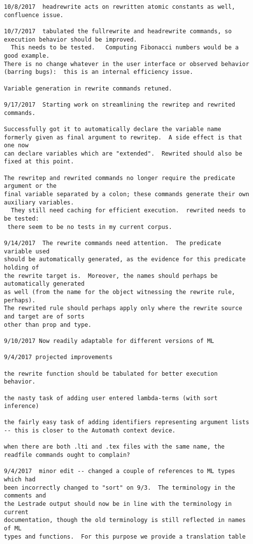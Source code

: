 \documentclass{article}
\begin{document}
{\begin{verbatim}
10/8/2017  headrewrite acts on rewritten atomic constants as well, confluence issue.

10/7/2017  tabulated the fullrewrite and headrewrite commands, so execution behavior should be improved.
  This needs to be tested.   Computing Fibonacci numbers would be a good example.  
There is no change whatever in the user interface or observed behavior (barring bugs):  this is an internal efficiency issue.

Variable generation in rewrite commands retuned.

9/17/2017  Starting work on streamlining the rewritep and rewrited commands.

Successfully got it to automatically declare the variable name 
formerly given as final argument to rewritep.  A side effect is that one now 
can declare variables which are "extended".  Rewrited should also be fixed at this point.

The rewritep and rewrited commands no longer require the predicate argument or the
final variable separated by a colon; these commands generate their own auxiliary variables.
  They still need caching for efficient execution.  rewrited needs to be tested: 
 there seem to be no tests in my current corpus.

9/14/2017  The rewrite commands need attention.  The predicate variable used
should be automatically generated, as the evidence for this predicate holding of 
the rewrite target is.  Moreover, the names should perhaps be automatically generated 
as well (from the name for the object witnessing the rewrite rule, perhaps).  
The rewrited rule should perhaps apply only where the rewrite source and target are of sorts
other than prop and type.

9/10/2017 Now readily adaptable for different versions of ML

9/4/2017 projected improvements

the rewrite function should be tabulated for better execution behavior.

the nasty task of adding user entered lambda-terms (with sort inference)

the fairly easy task of adding identifiers representing argument lists -- this is closer to the Automath context device.

when there are both .lti and .tex files with the same name, the readfile commands ought to complain?

9/4/2017  minor edit -- changed a couple of references to ML types which had
been incorrectly changed to "sort" on 9/3.  The terminology in the comments and
the Lestrade output should now be in line with the terminology in current
documentation, though the old terminology is still reflected in names of ML
types and functions.  For this purpose we provide a translation table


\end{verbatim}}
\end{document}
